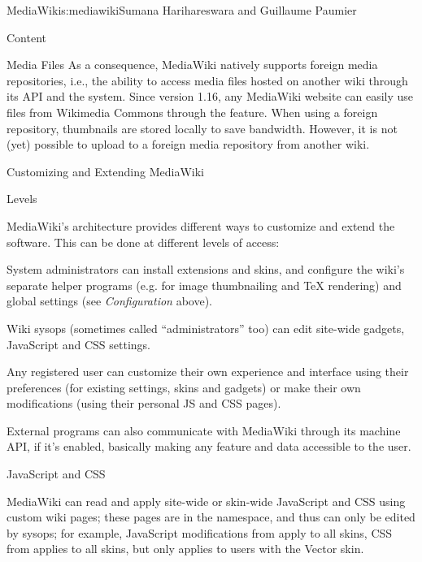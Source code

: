 \begin{aosachapter}{MediaWiki}{s:mediawiki}{Sumana Harihareswara and Guillaume Paumier}
\begin{aosasect1}{Content}
\begin{aosasect2}{Media Files}
As a consequence, MediaWiki natively supports foreign media
repositories, i.e., the ability to access media files hosted on
another wiki through its API and the 
system. Since version 1.16, any MediaWiki website can easily use files
from Wikimedia Commons through the  feature. When
using a foreign repository, thumbnails are stored locally to save
bandwidth. However, it is not (yet) possible to upload to a foreign
media repository from another wiki.

\end{aosasect2}

\end{aosasect1}

\begin{aosasect1}{Customizing and Extending MediaWiki}

\begin{aosasect2}{Levels}

MediaWiki's architecture provides different ways to customize and
extend the software. This can be done at different levels of access:

\begin{aosaitemize}

\item System administrators can install extensions and skins, and
  configure the wiki's separate helper programs (e.g. for image
  thumbnailing and TeX rendering) and global settings (see
  \emph{Configuration} above).

\item Wiki sysops (sometimes called ``administrators'' too) can edit
  site-wide gadgets, JavaScript and CSS settings.

\item Any registered user can customize their own experience and
  interface using their preferences (for existing settings, skins and
  gadgets) or make their own modifications (using their personal JS
  and CSS pages).

\end{aosaitemize}

External programs can also communicate with MediaWiki through its
machine API, if it's enabled, basically making any feature and data
accessible to the user.

\end{aosasect2}

\begin{aosasect2}{JavaScript and CSS}

MediaWiki can read and apply site-wide or skin-wide JavaScript and CSS
using custom wiki pages; these pages are in the 
namespace, and thus can only be edited by sysops; for example,
JavaScript modifications from  apply to all
skins, CSS from  applies to all skins, but
 only applies to users with the Vector
skin.


\end{aosasect2}
\end{aosasect1}
\end{aosachapter}
